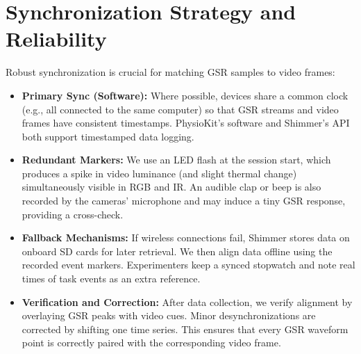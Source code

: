 \section{Synchronization Strategy and Reliability}
Robust synchronization is crucial for matching GSR samples to video frames:
\begin{itemize}
    \item \textbf{Primary Sync (Software):} Where possible, devices share a common clock (e.g., all connected to the same computer) so that GSR streams and video frames have consistent timestamps. PhysioKit’s software and Shimmer’s API both support timestamped data logging.
    \item \textbf{Redundant Markers:} We use an LED flash at the session start, which produces a spike in video luminance (and slight thermal change) simultaneously visible in RGB and IR. An audible clap or beep is also recorded by the cameras’ microphone and may induce a tiny GSR response, providing a cross-check.
    \item \textbf{Fallback Mechanisms:} If wireless connections fail, Shimmer stores data on onboard SD cards for later retrieval. We then align data offline using the recorded event markers. Experimenters keep a synced stopwatch and note real times of task events as an extra reference.
    \item \textbf{Verification and Correction:} After data collection, we verify alignment by overlaying GSR peaks with video cues. Minor desynchronizations are corrected by shifting one time series. This ensures that every GSR waveform point is correctly paired with the corresponding video frame.
\end{itemize}


